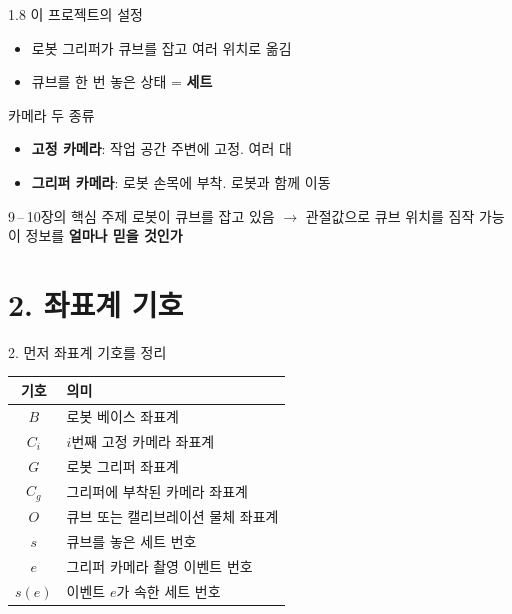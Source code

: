 \documentclass[aspectratio=169,11pt]{beamer}
\newif\ifcorrectedfk
\begin{document}
\begin{frame}{1.8 이 프로젝트의 설정}
  \begin{itemize}
    \item 로봇 그리퍼가 큐브를 잡고 여러 위치로 옮김
    \item 큐브를 한 번 놓은 상태 = \textbf{세트}
  \end{itemize}
  \vfill
  \begin{block}{카메라 두 종류}
    \begin{itemize}
      \item \textbf{고정 카메라}: 작업 공간 주변에 고정. 여러 대
      \item \textbf{그리퍼 카메라}: 로봇 손목에 부착. 로봇과 함께 이동
    \end{itemize}
  \end{block}
  \vfill
  \begin{alertblock}{9\,--\,\ifcorrectedfk 11\else 10\fi 장의 핵심 주제}
    로봇이 큐브를 잡고 있음 $\rightarrow$ 관절값으로 큐브 위치를 짐작 가능\\
    이 정보를 \textbf{얼마나 믿을 것인가}
  \end{alertblock}
\end{frame}

\section{2. 좌표계 기호}

\begin{frame}{2. 먼저 좌표계 기호를 정리}
  \begin{center}
    \begin{tabular}{cl}
      \toprule
      기호 & 의미 \\
      \midrule
      $B$      & 로봇 베이스 좌표계 \\
      $C_i$    & $i$번째 고정 카메라 좌표계 \\
      $G$      & 로봇 그리퍼 좌표계 \\
      $C_g$    & 그리퍼에 부착된 카메라 좌표계 \\
      $O$      & 큐브 또는 캘리브레이션 물체 좌표계 \\
      $s$      & 큐브를 놓은 세트 번호 \\
      $e$      & 그리퍼 카메라 촬영 이벤트 번호 \\
      $s(e)$   & 이벤트 $e$가 속한 세트 번호 \\
      \bottomrule
    \end{tabular}
  \end{center}
\end{frame}
\end{document}
